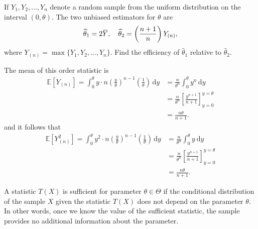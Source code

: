 \begin{example}
    If $Y_1, Y_2, \ldots, Y_n$ denote a random sample from the uniform distribution on the 
    interval $(0, \theta)$. The two unbiased estimators for $\theta$ are 
    \[
        \widehat{\theta}_1 = 2 \ols{Y}, \quad \widehat{\theta}_2 = \left( \frac{n+1}{n}\right) Y_{(n)},
    \]
    where $Y_{(n)} = \max\{ Y_1, Y_2, \ldots, Y_n \}$. Find the efficiency of $\widehat{\theta}_1$ relative to $\widehat{\theta}_2$.
\end{example}
\begin{solution}
    The mean of this order statistic is 
    \begin{align*}
        \mathbb{E}[Y_{(n)}] = \int^\theta_0 y \cdot n \left(\frac{y}{\theta}\right)^{n-1} \left(\frac{1}{\theta}\right)\, \mathrm{d}y
        &= \frac{n}{\theta^n} \int^\theta_0 y^n \, \mathrm{d}y\\
        &= \frac{n}{\theta^n} \left[ \frac{y^{n+1}}{n+1}\right]^{y=\theta}_{y=0}\\
        &= \frac{n\theta}{n+1}.
    \end{align*}
    and it follows that 
    \begin{align*}
        \mathbb{E}[Y^2_{(n)}] = \int^\theta_0 y^2 \cdot n \left(\frac{y}{\theta}\right)^{n-1} \left(\frac{1}{\theta}\right)\, \mathrm{d}y
        &= \frac{n}{\theta^n} \int^\theta_0 y^{} \, \mathrm{d}y\\
        &= \frac{n}{\theta^n} \left[ \frac{y^{n+1}}{n+1}\right]^{y=\theta}_{y=0}\\
        &= \frac{n\theta}{n+1}.
    \end{align*}
\end{solution}

\begin{definition}[Sufficiency]
    A statistic $T(X)$ is sufficient for parameter $\theta \in \Theta$ if 
    the conditional distribution of the sample $X$ given the statistic $T(X)$ 
    does not depend on the parameter $\theta$.
    In other words, once we know the value of the sufficient statistic, 
    the sample provides no additional information about the parameter.
\end{definition}


